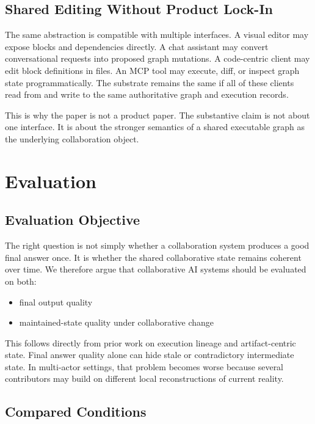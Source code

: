 \documentclass{article}
\begin{document}
\subsection{Shared Editing Without Product Lock-In}

The same abstraction is compatible with multiple interfaces. A visual editor may expose blocks and dependencies directly. A chat assistant may convert conversational requests into proposed graph mutations. A code-centric client may edit block definitions in files. An MCP tool may execute, diff, or inspect graph state programmatically. The substrate remains the same if all of these clients read from and write to the same authoritative graph and execution records.

This is why the paper is not a product paper. The substantive claim is not about one interface. It is about the stronger semantics of a shared executable graph as the underlying collaboration object.

\section{Evaluation}

\subsection{Evaluation Objective}

The right question is not simply whether a collaboration system produces a good final answer once. It is whether the shared collaborative state remains coherent over time. We therefore argue that collaborative AI systems should be evaluated on both:
\begin{itemize}
\item final output quality
\item maintained-state quality under collaborative change
\end{itemize}

This follows directly from prior work on execution lineage and artifact-centric state. Final answer quality alone can hide stale or contradictory intermediate state. In multi-actor settings, that problem becomes worse because several contributors may build on different local reconstructions of current reality.

\subsection{Compared Conditions}
\end{document}
